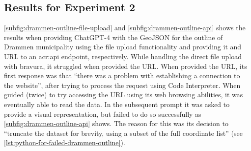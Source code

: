 \subsection{Results for Experiment 2}\label{subsec:experiment-2-results}

\autoref{subfig:drammen-outline-file-upload} and \autoref{subfig:drammen-outline-api} shows the results when providing ChatGPT-4 with the GeoJSON for the outline of Drammen municipality using the file upload functionality and providing it and URL to an \acrshort{acr:api} endpoint, respectively. While handling the direct file upload with bravura, it struggled when provided the URL. When provided the URL, its first response was that \enquote{there was a problem with establishing a connection to the website}, after trying to process the request using Code Interpreter. When guided (twice) to try accessing the URL using its web browsing abilities, it was eventually able to read the data. In the subsequent prompt it was asked to provide a visual representation, but failed to do so successfully as \autoref{subfig:drammen-outline-api} shows. The reason for this was its decision to \enquote{truncate the dataset for brevity, using a subset of the full coordinate list} (see \autoref{lst:python-for-failed-drammen-outline}).

